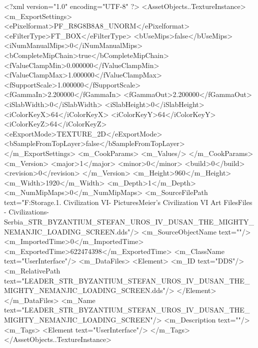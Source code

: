 <?xml version="1.0" encoding="UTF-8" ?>
<AssetObjects..TextureInstance>
	<m_ExportSettings>
		<ePixelformat>PF_R8G8B8A8_UNORM</ePixelformat>
		<eFilterType>FT_BOX</eFilterType>
		<bUseMips>false</bUseMips>
		<iNumManualMips>0</iNumManualMips>
		<bCompleteMipChain>true</bCompleteMipChain>
		<fValueClampMin>0.000000</fValueClampMin>
		<fValueClampMax>1.000000</fValueClampMax>
		<fSupportScale>1.000000</fSupportScale>
		<fGammaIn>2.200000</fGammaIn>
		<fGammaOut>2.200000</fGammaOut>
		<iSlabWidth>0</iSlabWidth>
		<iSlabHeight>0</iSlabHeight>
		<iColorKeyX>64</iColorKeyX>
		<iColorKeyY>64</iColorKeyY>
		<iColorKeyZ>64</iColorKeyZ>
		<eExportMode>TEXTURE_2D</eExportMode>
		<bSampleFromTopLayer>false</bSampleFromTopLayer>
	</m_ExportSettings>
	<m_CookParams>
		<m_Values/>
	</m_CookParams>
	<m_Version>
		<major>1</major>
		<minor>0</minor>
		<build>0</build>
		<revision>0</revision>
	</m_Version>
	<m_Height>960</m_Height>
	<m_Width>1920</m_Width>
	<m_Depth>1</m_Depth>
	<m_NumMipMaps>0</m_NumMipMaps>
	<m_SourceFilePath text="F:\Mod Storage\2.1. Civilization VI\Mods\Archive - Pictures\Sid Meier's Civilization VI Art Files\Art Files - Civilizations\Civilization - Serbia\LEADER_STR_BYZANTIUM_STEFAN_UROS_IV_DUSAN_THE_MIGHTY_NEMANJIC_LOADING_SCREEN.dds"/>
	<m_SourceObjectName text=""/>
	<m_ImportedTime>0</m_ImportedTime>
	<m_ExportedTime>622474398</m_ExportedTime>
	<m_ClassName text="UserInterface"/>
	<m_DataFiles>
		<Element>
			<m_ID text="DDS"/>
			<m_RelativePath text="LEADER_STR_BYZANTIUM_STEFAN_UROS_IV_DUSAN_THE_MIGHTY_NEMANJIC_LOADING_SCREEN.dds"/>
		</Element>
	</m_DataFiles>
	<m_Name text="LEADER_STR_BYZANTIUM_STEFAN_UROS_IV_DUSAN_THE_MIGHTY_NEMANJIC_LOADING_SCREEN"/>
	<m_Description text=""/>
	<m_Tags>
		<Element text="UserInterface"/>
	</m_Tags>
</AssetObjects..TextureInstance>

